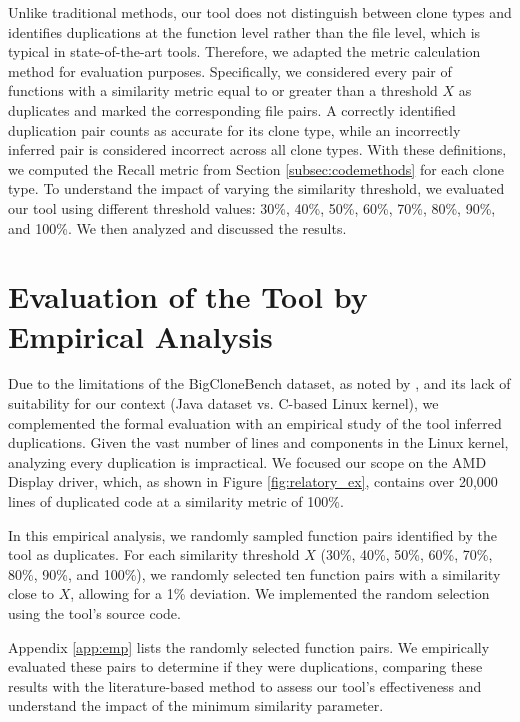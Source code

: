 Unlike traditional methods, our tool does not distinguish between clone types and identifies duplications at the function level rather than the file level, which is typical in state-of-the-art tools. Therefore, we adapted the metric calculation method for evaluation purposes. Specifically, we considered every pair of functions with a similarity metric equal to or greater than a threshold \(X\) as duplicates and marked the corresponding file pairs. A correctly identified duplication pair counts as accurate for its clone type, while an incorrectly inferred pair is considered incorrect across all clone types. With these definitions, we computed the Recall metric from Section \ref{subsec:codemethods} for each clone type.
%
To understand the impact of varying the similarity threshold, we evaluated our tool using different threshold values: 30\%, 40\%, 50\%, 60\%, 70\%, 80\%, 90\%, and 100\%. We then analyzed and discussed the results.

\section{Evaluation of the Tool by Empirical Analysis}

\label{sec:metemp}

Due to the limitations of the BigCloneBench dataset, as noted by \cite{bigfail}, and its lack of suitability for our context (Java dataset vs. C-based Linux kernel), we complemented the formal evaluation with an empirical study of the tool inferred duplications.
%
Given the vast number of lines and components in the Linux kernel, analyzing every duplication is impractical. We focused our scope on the AMD Display driver, which, as shown in Figure \ref{fig:relatory_ex}, contains over 20,000 lines of duplicated code at a similarity metric of 100\%.

In this empirical analysis, we randomly sampled function pairs identified by the tool as duplicates. For each similarity threshold \(X\) (30\%, 40\%, 50\%, 60\%, 70\%, 80\%, 90\%, and 100\%), we randomly selected ten function pairs with a similarity close to \(X\), allowing for a 1\% deviation. We implemented the random selection using the tool's source code.

Appendix \ref{app:emp} lists the randomly selected function pairs. We empirically evaluated these pairs to determine if they were duplications, comparing these results with the literature-based method to assess our tool's effectiveness and understand the impact of the minimum similarity parameter.

